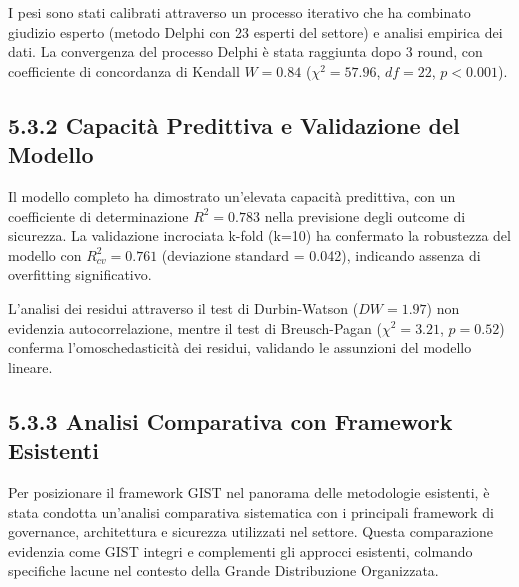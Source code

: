 I pesi sono stati calibrati attraverso un processo iterativo che ha combinato giudizio esperto (metodo Delphi con 23 esperti del settore) e analisi empirica dei dati. La convergenza del processo Delphi è stata raggiunta dopo 3 round, con coefficiente di concordanza di Kendall $W = 0.84$ ($\chi^2 = 57.96$, $df = 22$, $p < 0.001$).

\subsection{5.3.2 Capacità Predittiva e Validazione del Modello}

Il modello completo ha dimostrato un'elevata capacità predittiva, con un coefficiente di determinazione $R^2 = 0.783$ nella previsione degli outcome di sicurezza. La validazione incrociata k-fold (k=10) ha confermato la robustezza del modello con $R^2_{cv} = 0.761$ (deviazione standard = 0.042), indicando assenza di overfitting significativo.

L'analisi dei residui attraverso il test di Durbin-Watson ($DW = 1.97$) non evidenzia autocorrelazione, mentre il test di Breusch-Pagan ($\chi^2 = 3.21$, $p = 0.52$) conferma l'omoschedasticità dei residui, validando le assunzioni del modello lineare.

\subsection{5.3.3 Analisi Comparativa con Framework Esistenti}

Per posizionare il framework GIST nel panorama delle metodologie esistenti, è stata condotta un'analisi comparativa sistematica con i principali framework di governance, architettura e sicurezza utilizzati nel settore. Questa comparazione evidenzia come GIST integri e complementi gli approcci esistenti, colmando specifiche lacune nel contesto della Grande Distribuzione Organizzata.

